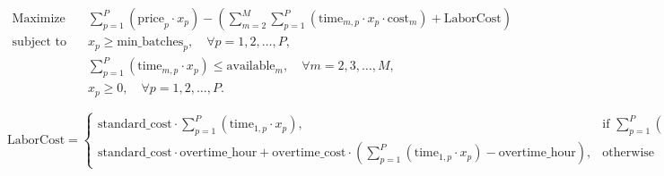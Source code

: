 \documentclass{article}
\begin{document}
\begin{align*}
\text{Maximize} \quad & \sum_{p=1}^{P} (\text{price}_p \cdot x_p) - \left( \sum_{m=2}^{M} \sum_{p=1}^{P} (\text{time}_{m,p} \cdot x_p \cdot \text{cost}_m) + \text{LaborCost} \right) \\
\text{subject to} \quad & x_p \geq \text{min\_batches}_p, \quad \forall p = 1, 2, \ldots, P, \\
& \sum_{p=1}^{P} (\text{time}_{m,p} \cdot x_p) \leq \text{available}_m, \quad \forall m = 2, 3, \ldots, M, \\
& x_p \geq 0, \quad \forall p = 1, 2, \ldots, P.
\end{align*}


\[
\text{LaborCost} = \begin{cases} 
  \text{standard\_cost} \cdot \sum_{p=1}^{P} (\text{time}_{1,p} \cdot x_p), & \text{if } \sum_{p=1}^{P} (\text{time}_{1,p} \cdot x_p) \leq \text{overtime\_hour} \\
  \text{standard\_cost} \cdot \text{overtime\_hour} + \text{overtime\_cost} \cdot \left( \sum_{p=1}^{P} (\text{time}_{1,p} \cdot x_p) - \text{overtime\_hour} \right), & \text{otherwise}
  \end{cases}
\]
\end{document}

